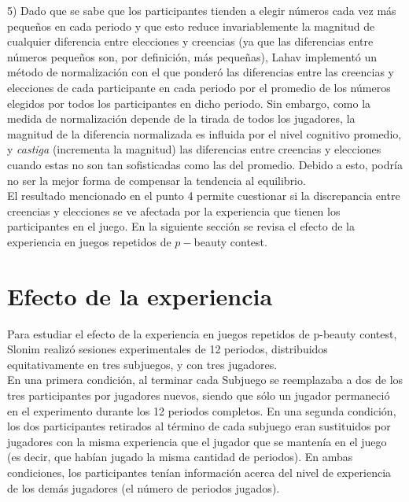 5) Dado que se sabe que los participantes tienden a elegir números cada vez más pequeños en cada periodo y que esto reduce invariablemente la magnitud de cualquier diferencia entre elecciones y creencias (ya que las diferencias entre números pequeños son, por definición, más pequeñas), Lahav implementó un método de normalización con el que ponderó las diferencias entre las creencias y elecciones de cada participante en cada periodo por el promedio de los números elegidos por todos los participantes en dicho periodo. Sin embargo, como la medida de normalización depende de la tirada de todos los jugadores, la magnitud de la diferencia normalizada es influida por el nivel cognitivo promedio, y \textit{castiga} (incrementa la magnitud) las diferencias entre creencias y elecciones cuando estas no son tan sofisticadas como las del promedio. Debido a esto, podría no ser la mejor forma de compensar la tendencia al equilibrio.\\

El resultado mencionado en el punto 4 permite cuestionar si la discrepancia entre creencias y elecciones se ve afectada por la experiencia que tienen los participantes en el juego.  En la siguiente sección se revisa el efecto de la experiencia en juegos repetidos de $p-$beauty contest.\\

\section{Efecto de la experiencia}

Para estudiar el efecto de la experiencia en juegos repetidos de p-beauty contest, Slonim \parencite*{Slonim2005} realizó sesiones experimentales de 12 periodos, distribuidos equitativamente en tres subjuegos, y con tres jugadores.\\

En una primera condición, al terminar cada Subjuego se reemplazaba a dos de los tres participantes por jugadores nuevos, siendo que sólo un jugador permaneció en el experimento durante los 12 periodos completos. En una segunda condición, los dos participantes retirados al término de cada subjuego eran sustituidos por jugadores con la misma experiencia que el jugador que se mantenía en el juego (es decir, que habían jugado la misma cantidad de periodos). En ambas condiciones, los participantes tenían información acerca del nivel de experiencia de los demás jugadores (el número de periodos jugados).\\

